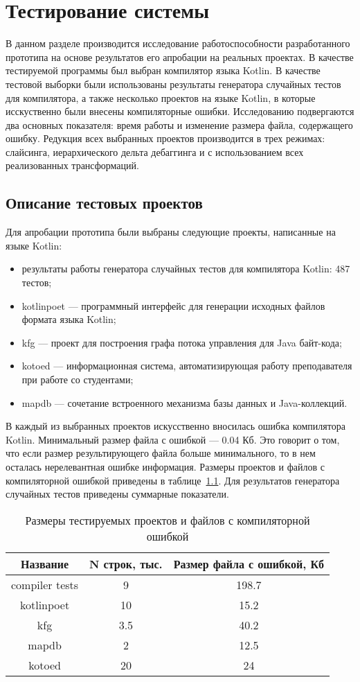 \chapter{Тестирование системы}
В данном разделе производится исследование работоспособности разработанного прототипа на основе результатов его апробации на реальных проектах. В качестве тестируемой программы был выбран компилятор языка Kotlin. В качестве тестовой выборки были использованы результаты генератора случайных тестов для компилятора, а также несколько проектов на языке Kotlin, в которые исскуственно были внесены компиляторные ошибки. Исследованию подвергаются два основных показателя: время работы и изменение размера файла, содержащего ошибку. Редукция всех выбранных проектов производится в трех режимах: слайсинга, иерархического дельта дебаггинга и с использованием всех реализованных трансформаций.
\section{Описание тестовых проектов}
Для апробации прототипа были выбраны следующие проекты, написанные на языке Kotlin:
\begin{itemize}
\item результаты работы генератора случайных тестов для компилятора Kotlin: 487 тестов;
\item kotlinpoet --- программный интерфейс для генерации исходных файлов формата языка Kotlin; 
\item kfg --- проект для построения графа потока управления для Java байт-кода;
\item kotoed --- информационная система, автоматизирующая работу преподавателя при работе со студентами;
\item mapdb --- сочетание встроенного механизма базы данных и Java-коллекций.
\end{itemize}
В каждый из выбранных проектов искусственно вносилась ошибка компилятора Kotlin. Минимальный размер файла с ошибкой --- 0.04 Кб. Это говорит о том, что если размер результирующего файла больше минимального, то в нем осталась нерелевантная ошибке информация. Размеры проектов и файлов с компиляторной ошибкой приведены в таблице~\ref{tab:size}. Для результатов генератора случайных тестов приведены суммарные показатели.
\begin{table}[]
\center
\caption{\label{tab:size}Размеры тестируемых проектов и файлов с компиляторной ошибкой}
\begin{tabular}{| c | c | c |}
\hline
\bf Название & \bf N строк, тыс. & \bf Размер файла с ошибкой, Кб \\
\hline
compiler tests & 9 & 198.7\\
\hline
kotlinpoet & 10 & 15.2\\
\hline
kfg & 3.5 & 40.2\\
\hline
mapdb & 2 & 12.5\\
\hline
kotoed & 20 & 24\\
\hline
\end{tabular}
\end{table}

